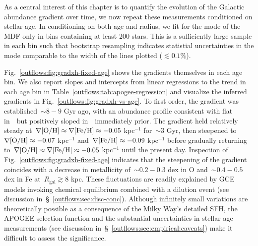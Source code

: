 As a central interest of this chapter is to quantify the evolution of the
Galactic abundance gradient over time, we now repeat these measurements
conditioned on stellar age.
In conditioning on both age and radius, we fit for the mode of the MDF only in
bins containing at least 200 stars.
This is a sufficiently large sample in each bin such that bootstrap resampling
indicates statistial uncertainties in the mode comparable to the width of the
lines plotted ($\lesssim0.1\%$).
\par
Fig.~\ref{outflows:fig:gradxh-fixed-age} shows the gradients themselves in each
age bin.
We also report slopes and intercepts from linear regressions to the trend in
each age bin in Table~\ref{outflows:tab:apogee-regression} and visualize the
inferred gradients in Fig.~\ref{outflows:fig:gradxh-vs-age}.
To first order, the gradient was established~$\sim$$8 - 9$ Gyr ago, with an
abundance profile consistent with flat in~\oh~but positively sloped
in~\feh~immediately prior.
The gradient held relatively steady at~$\nabla\text{[O/H]} \approx \nabla\text{[Fe/H]} \approx
-0.05$ kpc$^{-1}$ for~$\sim$3 Gyr, then steepened to~$\nabla\text{[O/H]} \approx -0.07$
kpc$^{-1}$ and~$\nabla\text{[Fe/H]} \approx -0.09$ kpc$^{-1}$ before gradually returning
to~$\nabla\text{[O/H]} \approx \nabla\text{[Fe/H]} \approx -0.05$ kpc$^{-1}$ until the present day.
Inspection of Fig.~\ref{outflows:fig:gradxh-fixed-age} indicates that the
steepening of the gradient coincides with a decrease in metallicity
of~$\sim$$0.2 - 0.3$ dex in O and~$\sim$$0.4 - 0.5$ dex in Fe
at~$R_\text{gal} \gtrsim$8 kpc.
These fluctuations are readily explained by GCE models invoking chemical
equilibrium combined with a dilution event (see discussion
in~\S~\ref{outflows:sec:disc-conc}).
Although infinitely small variations are theoretically possible as a
consequence of the Milky Way's detailed SFH, the APOGEE selection function and
the substantial uncertainties in stellar age measurements (see discussion
in~\S~\ref{outflows:sec:empirical:caveats}) make it difficult to assess the
significance.


